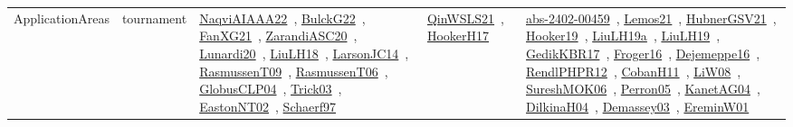 {\begin{longtable}{lp{3cm}>{\raggedright\arraybackslash}p{6cm}>{\raggedright\arraybackslash}p{6cm}>{\raggedright\arraybackslash}p{8cm}}
\index{tournament}\index{ApplicationAreas!tournament}ApplicationAreas & tournament & \href{../works/NaqviAIAAA22.pdf}{NaqviAIAAA22}~\cite{NaqviAIAAA22}, \href{../works/BulckG22.pdf}{BulckG22}~\cite{BulckG22}, \href{../works/FanXG21.pdf}{FanXG21}~\cite{FanXG21}, \href{../works/ZarandiASC20.pdf}{ZarandiASC20}~\cite{ZarandiASC20}, \href{../works/Lunardi20.pdf}{Lunardi20}~\cite{Lunardi20}, \href{../works/LiuLH18.pdf}{LiuLH18}~\cite{LiuLH18}, \href{../works/LarsonJC14.pdf}{LarsonJC14}~\cite{LarsonJC14}, \href{../works/RasmussenT09.pdf}{RasmussenT09}~\cite{RasmussenT09}, \href{../works/RasmussenT06.pdf}{RasmussenT06}~\cite{RasmussenT06}, \href{../works/GlobusCLP04.pdf}{GlobusCLP04}~\cite{GlobusCLP04}, \href{../works/Trick03.pdf}{Trick03}~\cite{Trick03}, \href{../works/EastonNT02.pdf}{EastonNT02}~\cite{EastonNT02}, \href{../works/Schaerf97.pdf}{Schaerf97}~\cite{Schaerf97} & \href{../works/QinWSLS21.pdf}{QinWSLS21}~\cite{QinWSLS21}, \href{../works/HookerH17.pdf}{HookerH17}~\cite{HookerH17} & \href{../works/abs-2402-00459.pdf}{abs-2402-00459}~\cite{abs-2402-00459}, \href{../works/Lemos21.pdf}{Lemos21}~\cite{Lemos21}, \href{../works/HubnerGSV21.pdf}{HubnerGSV21}~\cite{HubnerGSV21}, \href{../works/Hooker19.pdf}{Hooker19}~\cite{Hooker19}, \href{../works/LiuLH19a.pdf}{LiuLH19a}~\cite{LiuLH19a}, \href{../works/LiuLH19.pdf}{LiuLH19}~\cite{LiuLH19}, \href{../works/GedikKBR17.pdf}{GedikKBR17}~\cite{GedikKBR17}, \href{../works/Froger16.pdf}{Froger16}~\cite{Froger16}, \href{../works/Dejemeppe16.pdf}{Dejemeppe16}~\cite{Dejemeppe16}, \href{../works/RendlPHPR12.pdf}{RendlPHPR12}~\cite{RendlPHPR12}, \href{../works/CobanH11.pdf}{CobanH11}~\cite{CobanH11}, \href{../works/LiW08.pdf}{LiW08}~\cite{LiW08}, \href{../works/SureshMOK06.pdf}{SureshMOK06}~\cite{SureshMOK06}, \href{../works/Perron05.pdf}{Perron05}~\cite{Perron05}, \href{../works/KanetAG04.pdf}{KanetAG04}~\cite{KanetAG04}, \href{../works/DilkinaH04.pdf}{DilkinaH04}~\cite{DilkinaH04}, \href{../works/Demassey03.pdf}{Demassey03}~\cite{Demassey03}, \href{../works/EreminW01.pdf}{EreminW01}~\cite{EreminW01}\\

\end{longtable}}
